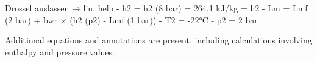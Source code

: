 Drossel auslassen → lin. help
- h2 = h2 (8 bar) = 264.1 kJ/kg = h2
- Lm = Lmf (2 bar) + bwr × (h2 (p2) - Lmf (1 bar))
- T2 = -22°C
- p2 = 2 bar

Additional equations and annotations are present, including calculations involving enthalpy and pressure values.